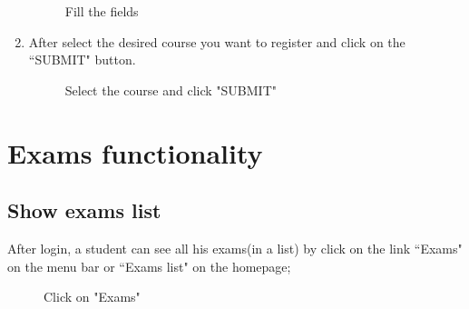 \documentclass[ManualeUtente]{subfiles}
\begin{document}
\begin{enumerate}
\begin{figure}[H]
		\caption{Fill the fields}
		\label{fig:Fill the fields}
	\end{figure}
	\item After select the desired course you want to register and click on the \textquotedblleft SUBMIT" button.
	\begin{figure}[H]
		\centering
		\caption{Select the course and click "SUBMIT"}
		\label{fig:Select the course and click "SUBMIT"}
	\end{figure}
\end{enumerate}

\newpage
\section{Exams functionality}
\subsection{Show exams list}
After login, a student can see all his exams(in a list) by click on the link \textquotedblleft Exams" on the menu bar or \textquotedblleft Exams list" on the homepage;
	\begin{figure}[H]
		\centering
		\caption{Click on "Exams"}
		\label{fig:Click on "Exams"}
	\end{figure}
\end{document}
